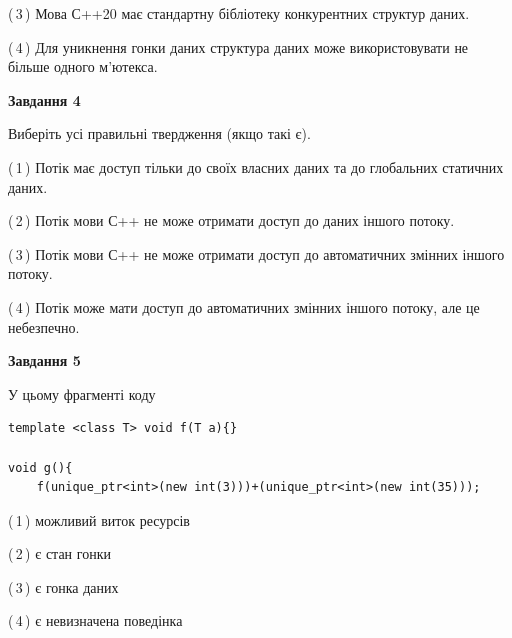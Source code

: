 \documentclass[12pt, ukrainian]{article}
\begin{document}
\begin {large}
{(\,3\,) Мова С++20 має стандартну бібліотеку конкурентних структур даних.%

(\,4\,) Для уникнення гонки даних структура даних може використовувати не більше одного м’ютекса.%



\begin{center}
\textbf{Завдання 4}
\end{center}
Виберіть усі правильні твердження (якщо такі є).\par
\vspace{2mm}

(\,1\,) Потік має доступ тільки до своїх власних даних та до глобальних статичних даних.%

(\,2\,) Потік мови С++ не може отримати доступ до даних іншого потоку.%

(\,3\,) Потік мови С++ не може отримати доступ до автоматичних змінних іншого потоку.%

(\,4\,) Потік може мати доступ до автоматичних змінних іншого потоку, але це небезпечно.%



\begin{center}
\textbf{Завдання 5}
\end{center}
У цьому фрагменті коду
\begin{verbatim}
template <class T> void f(T a){}

void g(){
    f(unique_ptr<int>(new int(3)))+(unique_ptr<int>(new int(35)));
\end{verbatim}

(\,1\,) можливий виток ресурсів%

(\,2\,) є стан гонки%

(\,3\,) є гонка даних%

(\,4\,) є невизначена поведінка%


}
\end {large}
\end{document}
